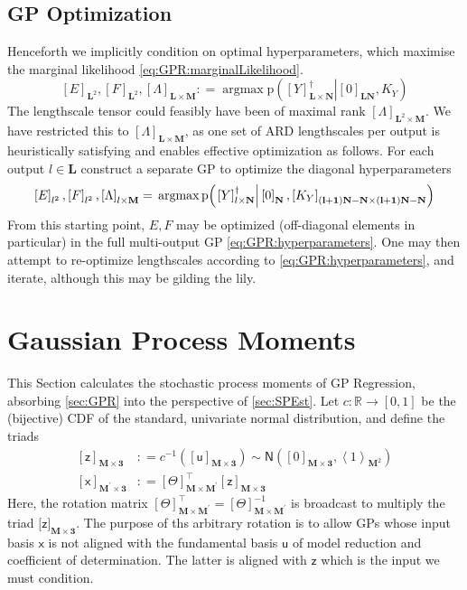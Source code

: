 \documentclass[preprint,12pt]{elsarticle}
\newcommand*{\M}[1]{\ensuremath{#1}\xspace}
\newcommand*{\x}{\times}
\newcommand*{\mi}[1]{\mathbf{#1}}
\newcommand*{\st}[1]{\mathbb{#1}}
\newcommand*{\rv}[1]{\mathsf{#1}}
\newcommand*{\te}[2][]{\left\lbrack{#2}\right\rbrack_{#1}}
\newcommand*{\tte}[2][]{\lbrack{#2}\rbrack_{#1}}
\newcommand*{\diag}[2][]{\left\langle{#2}\right\rangle_{#1}}
\newcommand*{\prob}[3]{\M{\mathrm{p}\!\left(\left.{#1}\right\vert{#2,#3}\right)}}
\newcommand*{\deq}{\M{\mathrel{\mathop:}=}}
\newcommand*{\gauss}[2]{\mathsf{N}\!\left({#1,#2}\right)}
\DeclareMathOperator*{\argmax}{argmax}
\begin{document}
    \subsection{GP Optimization} \label{sub:GPR:Optimization}
        Henceforth we implicitly condition on optimal hyperparameters, which maximise the marginal likelihood \cref{eq:GPR:marginalLikelihood}.
        \begin{equation} \label{eq:GPR:hyperparameters}
            \te[\mi{L}^{2}]{E},\te[\mi{L}^{2}]{F},\te[\mi{L}\x\mi{M}]{\Lambda} \deq \argmax \prob{\te[\mi{L\x N}]{Y}^{\dagger}}{\te[\mi{LN}]{0}}{K_Y}
        \end{equation}
        The lengthscale tensor could feasibly have been of maximal rank $\te[\mi{L}^{2}\x\mi{M}]{\Lambda}$. We have restricted this to $\te[\mi{L}\x\mi{M}]{\Lambda}$, as one set of ARD lengthscales per output is heuristically satisfying and enables effective optimization as follows.
        For each output $l \in \mi{L}$ construct a separate GP to optimize the diagonal hyperparameters
        \begin{equation*}
            \te[l^{2}]{E},\te[l^{2}]{F},\te[l\x\mi{M}]{\Lambda} = \\
            \argmax \prob{\te[l\x \mi{N}]{Y}^{\dagger}}{\te[\mi{N}]{0}}{\te[\mi{(l+1)N-N}\x\mi{(l+1)N-N}]{K_Y}}
        \end{equation*}
        From this starting point, $E,F$ may be optimized (off-diagonal elements in particular) in the full multi-output GP \cref{eq:GPR:hyperparameters}. One may then attempt to re-optimize lengthscales according to \cref{eq:GPR:hyperparameters}, and iterate, although this may be gilding the lily.


\section{Gaussian Process Moments}\label{sec:GPMom}
    This Section calculates the stochastic process moments of GP Regression, absorbing \cref{sec:GPR} into the perspective of \cref{sec:SPEst}.
    Let $c\colon \st{R} \to [0,1]$ be the (bijective) CDF of the standard, univariate normal distribution, and define the triads
    \begin{equation*}
        \begin{aligned}
            \te[\mi{M\x 3}]{\rv{z}} &\deq c^{-1}\!\left(\te[\mi{M\x 3}]
            {\rv{u}}\right) \sim \gauss{\te[\mi{M\x 3}]{0}}{\diag[\mi{M}^{2}]{1}} \\
            \te[\mi{M^{\prime}\x 3}]{\rv{x}} &\deq \te[\mi{M\x M^{\prime}}]{\Theta}^{\intercal} \te[\mi{M\x 3}]{\rv{z}}
        \end{aligned}
    \end{equation*}
    Here, the rotation matrix $\te[\mi{M\x M^{\prime}}]{\Theta}^{\intercal} = \te[\mi{M\x M^{\prime}}]{\Theta}^{-1}$ is broadcast to multiply the triad $\tte[\mi{M\x 3}]{\rv{z}}$. 
    The purpose of ths arbitrary rotation is to allow GPs whose input basis $\rv{x}$ is not aligned with the fundamental basis $\rv{u}$ of model reduction and coefficient of determination. The latter is aligned with $\rv{z}$ which is the input we must condition.
    
\end{document}
